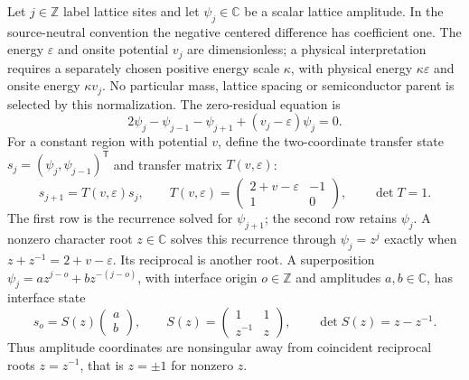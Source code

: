 Let $j\in\mathbb Z$ label lattice sites and let $\psi_j\in\mathbb C$ be a
scalar lattice amplitude. In the source-neutral convention the negative
centered difference has coefficient one. The energy $\varepsilon$ and onsite
potential $v_j$ are dimensionless; a physical interpretation requires a
separately chosen positive energy scale $\kappa$, with physical energy
$\kappa\varepsilon$ and onsite energy $\kappa v_j$. No particular mass,
lattice spacing or semiconductor parent is selected by this normalization.
The zero-residual equation is
\begin{equation}
  2\psi_j-\psi_{j-1}-\psi_{j+1}+(v_j-\varepsilon)\psi_j=0.
  \label{eq:auxiliary-lattice-barrier-recurrence}
\end{equation}
For a constant region with potential $v$, define the two-coordinate transfer
state $s_j=(\psi_j,\psi_{j-1})^{\mathsf T}$ and transfer matrix $T(v,\varepsilon)$:
\begin{equation}
  s_{j+1}=T(v,\varepsilon)s_j,\qquad
  T(v,\varepsilon)=\begin{pmatrix}2+v-\varepsilon&-1\\1&0\end{pmatrix},
  \qquad \det T=1.
  \label{eq:auxiliary-one-site-transfer}
\end{equation}
The first row is the recurrence solved for $\psi_{j+1}$; the second row
retains $\psi_j$. A nonzero character root $z\in\mathbb C$ solves this
recurrence through $\psi_j=z^j$ exactly when
$z+z^{-1}=2+v-\varepsilon$. Its reciprocal is another root. A superposition
$\psi_j=a z^{j-o}+b z^{-(j-o)}$, with interface origin $o\in\mathbb Z$
and amplitudes $a,b\in\mathbb C$, has interface state
\begin{equation}
  s_o=S(z)\begin{pmatrix}a\\b\end{pmatrix},\qquad
  S(z)=\begin{pmatrix}1&1\\z^{-1}&z\end{pmatrix},\qquad
  \det S(z)=z-z^{-1}.
  \label{eq:auxiliary-lead-interface}
\end{equation}
Thus amplitude coordinates are nonsingular away from coincident reciprocal
roots $z=z^{-1}$, that is $z=\pm1$ for nonzero $z$.

